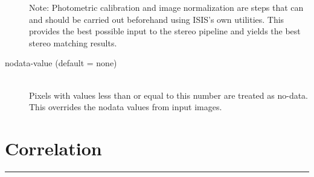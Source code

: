 \begin{description}
  Note: Photometric calibration and image normalization are steps that
  can and should be carried out beforehand using ISIS's own utilities.
  This provides the best possible input to the stereo pipeline and
  yields the best stereo matching results.

\item[nodata-value \textnormal (default = none)] \hfill \\
  Pixels with values less than or equal to this number are treated as
  no-data. This overrides the nodata values from input images.

\end{description}

\section{Correlation}\label{corr_section}
\hrule
\bigskip

